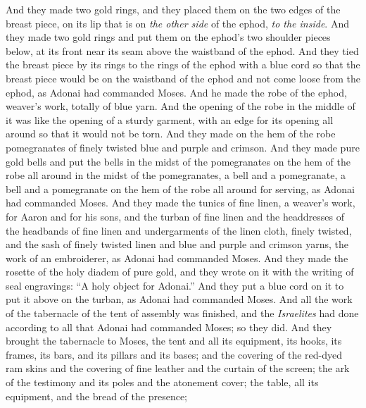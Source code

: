 \begin{biblechapter}
\verse And they made two gold rings, and they placed them on the two edges of the breast piece, on its lip that is on \textit{the other side} of the ephod, \textit{to the inside}.
\verse And they made two gold rings and put them on the ephod’s two shoulder pieces below, at its front near its seam above the waistband of the ephod.
\verse And they tied the breast piece by its rings to the rings of the ephod with a blue cord so that the breast piece would be on the waistband of the ephod and not come loose from the ephod, as Adonai had commanded Moses.
\verse And he made the robe of the ephod, weaver’s work, totally of blue yarn.
\verse And the opening of the robe in the middle of it was like the opening of a sturdy garment, with an edge for its opening all around so that it would not be torn.
\verse And they made on the hem of the robe pomegranates of finely twisted blue and purple and crimson.
\verse And they made pure gold bells and put the bells in the midst of the pomegranates on the hem of the robe all around in the midst of the pomegranates,
\verse a bell and a pomegranate, a bell and a pomegranate on the hem of the robe all around for serving, as Adonai had commanded Moses.
\verse And they made the tunics of fine linen, a weaver’s work, for Aaron and for his sons,
\verse and the turban of fine linen and the headdresses of the headbands of fine linen and undergarments of the linen cloth, finely twisted,
\verse and the sash of finely twisted linen and blue and purple and crimson yarns, the work of an embroiderer, as Adonai had commanded Moses.
\verse And they made the rosette of the holy diadem of pure gold, and they wrote on it with the writing of seal engravings: “A holy object for Adonai.”
\verse And they put a blue cord on it to put it above on the turban, as Adonai had commanded Moses.
 And all the work of the tabernacle of the tent of assembly was finished, and the \textit{Israelites} had done according to all that Adonai had commanded Moses; so they did.
\verse And they brought the tabernacle to Moses, the tent and all its equipment, its hooks, its frames, its bars, and its pillars and its bases;
\verse and the covering of the red-dyed ram skins and the covering of fine leather and the curtain of the screen;
\verse the ark of the testimony and its poles and the atonement cover;
\verse the table, all its equipment, and the bread of the presence;

\end{biblechapter}
